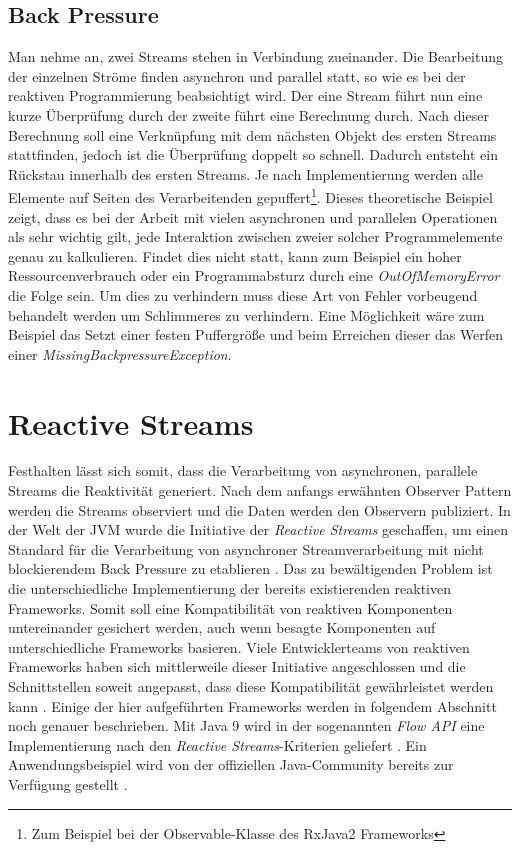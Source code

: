 \subsection{Back Pressure}
Man nehme an, zwei Streams stehen in Verbindung zueinander. Die Bearbeitung der einzelnen Ströme finden asynchron und parallel statt, so wie es bei der reaktiven Programmierung beabsichtigt wird. Der eine Stream führt nun eine kurze Überprüfung durch der zweite führt eine Berechnung durch. Nach dieser Berechnung soll eine Verknüpfung mit dem nächsten Objekt des ersten Streams stattfinden, jedoch ist die Überprüfung doppelt so schnell. Dadurch entsteht ein Rückstau innerhalb des ersten Streams. Je nach Implementierung werden alle Elemente auf Seiten des Verarbeitenden gepuffert\footnote{Zum Beispiel bei der Observable-Klasse des RxJava2 Frameworks}. Dieses theoretische Beispiel zeigt, dass es bei der Arbeit mit vielen asynchronen und parallelen Operationen als sehr wichtig gilt, jede Interaktion zwischen zweier solcher Programmelemente genau zu kalkulieren. Findet dies nicht statt, kann zum Beispiel ein hoher Ressourcenverbrauch oder ein Programmabsturz durch eine \textit{OutOfMemoryError} die Folge sein. Um dies zu verhindern muss diese Art von Fehler vorbeugend behandelt werden um Schlimmeres zu verhindern. Eine Möglichkeit wäre zum Beispiel das Setzt einer festen Puffergröße und beim Erreichen dieser das Werfen einer \textit{MissingBackpressureException}.
\section{Reactive Streams}
Festhalten lässt sich somit, dass die Verarbeitung von asynchronen, parallele Streams die Reaktivität generiert. Nach dem anfangs erwähnten Observer Pattern werden die Streams observiert und die Daten werden den Observern publiziert. In der Welt der JVM wurde die Initiative der \textit{Reactive Streams} geschaffen, um einen Standard für die Verarbeitung von asynchroner Streamverarbeitung mit nicht blockierendem Back Pressure zu etablieren \cite{rsmain}. Das zu bewältigenden Problem ist die unterschiedliche Implementierung der bereits existierenden reaktiven Frameworks. Somit soll eine Kompatibilität von reaktiven Komponenten untereinander gesichert werden, auch wenn besagte Komponenten auf unterschiedliche Frameworks basieren. Viele Entwicklerteams von reaktiven Frameworks haben sich mittlerweile dieser Initiative angeschlossen und die Schnittstellen soweit angepasst, dass diese Kompatibilität gewährleistet werden kann \cite{rslsting}. Einige der hier aufgeführten Frameworks werden in folgendem Abschnitt noch genauer beschrieben. Mit Java 9 wird in der sogenannten \textit{Flow API} eine Implementierung nach den \textit{Reactive Streams}-Kriterien geliefert \cite{flowdoc}. Ein Anwendungsbeispiel wird von der offiziellen Java-Community bereits zur Verfügung gestellt \cite{flowexmpl}.  
